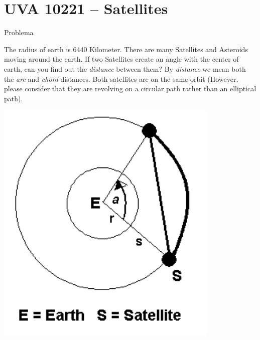 \section{UVA 10221 -- Satellites}

\begin{frame}[fragile]{Problema}

\begin{minipage}{0.45\textwidth}
The radius of earth is 6440 Kilometer. There are many Satellites
and Asteroids moving around the earth. If two Satellites create
an angle with the center of earth, can you find out the \textit{distance}
between them? By \textit{distance} we mean both the \textit{arc} and \textit{chord}
distances. Both satellites are on the same orbit (However, please
consider that they are revolving on a circular path rather than
an elliptical path).
\end{minipage}
\begin{minipage}{0.5\textwidth}
\begin{center}
\includegraphics[scale=0.75]{figure.png}
\end{center}
\end{minipage}

\end{frame}

